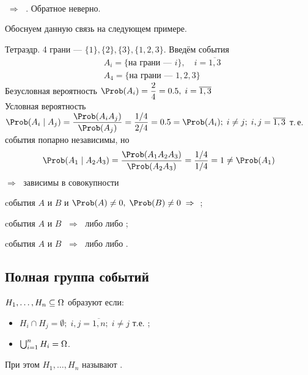 \begin{rem}[\bi{связь}]\hfill\\
	 $\;\Rightarrow\;$ . Обратное неверно.
\end{rem}

\noindent
Обоснуем данную связь на следующем примере.

\begin{example}
	Тетраэдр. 4 грани --- $\{1\}, \{2\}, \{3\}, \{1, 2, 3\}$. Введём события
	\begin{align*}
		&A_i = \{ \text{на грани --- } i \}, \quad i = \overline{1, 3} \\
		&A_4 = \{ \text{на грани --- } 1, 2, 3 \}
	\end{align*}
	Безусловная вероятность $\Prob(A_i) = \dfrac{2}{4} = 0.5,\; i = \overline{1, 3}$ \\
	Условная вероятность $\Prob(A_i \mid A_j) = \dfrac{\Prob(A_i A_j)}{\Prob(A_j)} = \dfrac{1/4}{2/4} = 0.5 = \Prob(A_i);\; i \neq j;\; i, j = \overline{1, 3}$
	т.\,е. события попарно независимы, но
	\[
		\Prob(A_1 \mid A_2 A_3) = \dfrac{\Prob(A_1 A_2 A_3)}{\Prob(A_2 A_3)} = \dfrac{1/4}{1/4} = 1 \neq \Prob(A_1)
	\]
	$\Rightarrow\;$ зависимы в совокупности
\end{example}

\begin{rem}\hfill
	\begin{itemize*}
		\item cобытия $A$ и $B$  и $\Prob(A) \neq 0,\; \Prob(B) \neq 0 \;\Rightarrow\;$ ;
		\item cобытия $A$ и $B$  $\;\Rightarrow\;$ либо  либо ;
		\item cобытия $A$ и $B$  $\;\Rightarrow\;$ либо  либо .
	\end{itemize*}
\end{rem}



\subsection{Полная группа событий}

\begin{definition}
	 $H_1, \dots, H_n \subseteq \Omega$ образуют  если:
	\begin{itemize}
		\item $H_i \cap H_j = \emptyset;\; i, j = \overline{1, n};\; i \neq j$ т.е. ;
		\item $\bigcup_{i = 1}^{n} H_i = \Omega$.
	\end{itemize}
	При этом  $H_1, \dots, H_n$ называют .
\end{definition}


